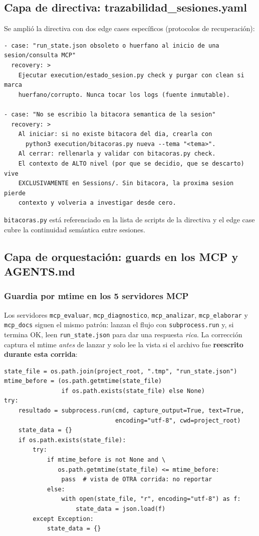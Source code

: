 \documentclass[11pt,a4paper]{article}
\begin{document}
\subsection{Capa de directiva: trazabilidad\_sesiones.yaml}
Se amplió la directiva con dos edge cases específicos (protocolos de recuperación):

\begin{lstlisting}
- case: "run_state.json obsoleto o huerfano al inicio de una sesion/consulta MCP"
  recovery: >
    Ejecutar execution/estado_sesion.py check y purgar con clean si marca
    huerfano/corrupto. Nunca tocar los logs (fuente inmutable).

- case: "No se escribio la bitacora semantica de la sesion"
  recovery: >
    Al iniciar: si no existe bitacora del dia, crearla con
      python3 execution/bitacoras.py nueva --tema "<tema>".
    Al cerrar: rellenarla y validar con bitacoras.py check.
    El contexto de ALTO nivel (por que se decidio, que se descarto) vive
    EXCLUSIVAMENTE en Sessions/. Sin bitacora, la proxima sesion pierde
    contexto y volveria a investigar desde cero.
\end{lstlisting}

\texttt{bitacoras.py} está referenciado en la lista de scripts de la directiva
y el edge case cubre la continuidad semántica entre sesiones.

\subsection{Capa de orquestación: guards en los MCP y AGENTS.md}

\subsubsection{Guardia por mtime en los 5 servidores MCP}
Los servidores \texttt{mcp\_evaluar}, \texttt{mcp\_diagnostico}, \texttt{mcp\_analizar},
\texttt{mcp\_elaborar} y \texttt{mcp\_docs} siguen el mismo patrón: lanzan el flujo con
\texttt{subprocess.run} y, si termina OK, leen \texttt{run\_state.json} para dar una
respuesta \emph{rica}. La corrección captura el mtime \emph{antes} de lanzar y solo lee
la vista si el archivo fue \textbf{reescrito durante esta corrida}:

\begin{lstlisting}[style=estiloPython]
state_file = os.path.join(project_root, ".tmp", "run_state.json")
mtime_before = (os.path.getmtime(state_file)
                if os.path.exists(state_file) else None)
try:
    resultado = subprocess.run(cmd, capture_output=True, text=True,
                               encoding="utf-8", cwd=project_root)
    state_data = {}
    if os.path.exists(state_file):
        try:
            if mtime_before is not None and \
               os.path.getmtime(state_file) <= mtime_before:
                pass  # vista de OTRA corrida: no reportar
            else:
                with open(state_file, "r", encoding="utf-8") as f:
                    state_data = json.load(f)
        except Exception:
            state_data = {}
\end{lstlisting}
\end{document}
